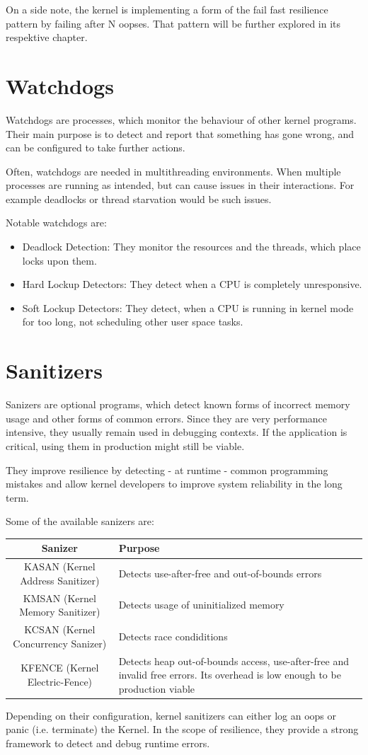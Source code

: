 On a side note, the kernel is implementing a form of the fail fast resilience pattern by failing after N oopses. That pattern will be further explored in its respektive chapter.

\section{Watchdogs}
Watchdogs are processes, which monitor the behaviour of other kernel programs. Their main purpose is to detect and report that something has gone wrong, and can be configured to take further actions.

Often, watchdogs are needed in multithreading environments. When multiple processes are running as intended, but can cause issues in their interactions. For example deadlocks or thread starvation would be such issues. 

Notable watchdogs are:
\begin{itemize}
    \item Deadlock Detection: They monitor the resources and the threads, which place locks upon them. \cite{runtime_locking_correctness}
    \item Hard Lockup Detectors: They detect when a CPU is completely unresponsive. \cite{soft_hard_lockup}
        \item Soft Lockup Detectors: They detect, when a CPU is running in kernel mode for too long, not scheduling other user space tasks.\cite{soft_hard_lockup}
\end{itemize}

\newpage
\section{Sanitizers}
Sanizers are optional programs, which detect known forms of incorrect memory usage and other forms of common errors. Since they are very performance intensive, they usually remain used in debugging contexts. If the application is critical, using them in production might still be viable.

They improve resilience by detecting - at runtime - common programming mistakes and allow kernel developers to improve system reliability in the long term.

Some of the available sanizers are: 
\begin{table}[h]
    \begin{tabular}{c | p{8cm} }
        \hline
        Sanizer & Purpose\\
        \hline
        KASAN (Kernel Address Sanitizer)& Detects use-after-free and out-of-bounds errors \cite{kasan} \\
        KMSAN (Kernel Memory Sanitizer) & Detects usage of uninitialized memory \cite{kmsan}\\
        KCSAN (Kernel Concurrency Sanizer) & Detects race condiditions \cite{kcsan} \\
        KFENCE (Kernel Electric-Fence) & Detects heap out-of-bounds access, use-after-free and invalid free errors. Its overhead is low enough to be production viable \cite{kfence} \\
        \hline
    \end{tabular}
\end{table}

Depending on their configuration, kernel sanitizers can either log an oops or panic (i.e. terminate) the Kernel. In the scope of resilience, they provide a strong framework to detect and debug runtime errors. 
